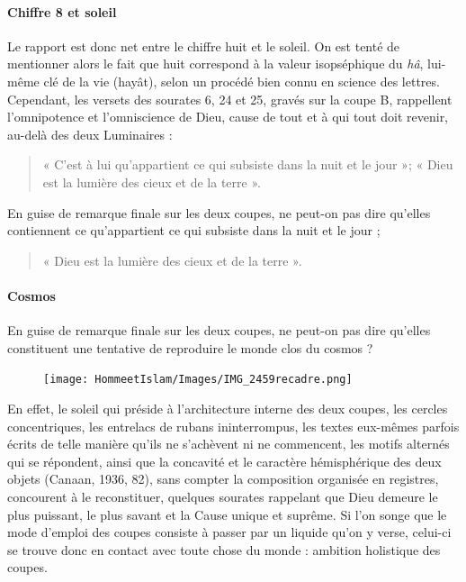  \paragraph{Chiffre 8 et soleil}
Le rapport est donc net entre le chiffre huit et le soleil. On est tenté de mentionner alors le fait que huit correspond à la valeur isopséphique du \textit{hâ}, lui-même clé de la vie (hayât), selon un procédé bien connu en science des lettres. Cependant, les versets des sourates 6, 24 et 25, gravés sur la coupe B, rappellent l'omnipotence et l'omniscience de Dieu, cause de tout et à qui tout doit revenir, au-delà des deux Luminaires : 
\begin{quote}
   « C'est à lui qu'appartient ce qui subsiste dans la nuit et le jour »; « Dieu est la lumière des cieux et de la terre ».

\end{quote}
En guise de remarque finale sur les deux coupes, ne peut-on pas dire qu'elles contiennent ce qu'appartient ce qui subsiste dans la nuit et le jour ; \begin{quote}
    « Dieu est la lumière des cieux et de la terre ». 
\end{quote}
\paragraph{Cosmos}
En guise de remarque finale sur les deux coupes, ne peut-on pas dire qu'elles constituent une tentative de reproduire le monde clos du cosmos ?
\begin{figure}
    \centering
\texttt{[image: HommeetIslam/Images/IMG\_2459recadre.png]}

    \label{fig:my_label}
\end{figure}




En effet, le soleil qui préside à l'architecture interne des deux coupes, les cercles concentriques, les entrelacs de rubans ininterrompus, les textes eux-mêmes parfois écrits de telle manière qu'ils ne s'achèvent ni ne commencent, les motifs alternés qui se répondent, ainsi que la concavité et le caractère hémisphérique des deux objets (Canaan, 1936, 82), sans compter la composition organisée en registres, concourent à le reconstituer, quelques sourates rappelant que Dieu demeure le plus puissant, le plus savant et la Cause unique et suprême. Si l'on songe que le mode d'emploi des coupes consiste à passer par un liquide qu'on y verse, celui-ci se trouve donc en contact avec toute chose du monde : ambition holistique des coupes.
